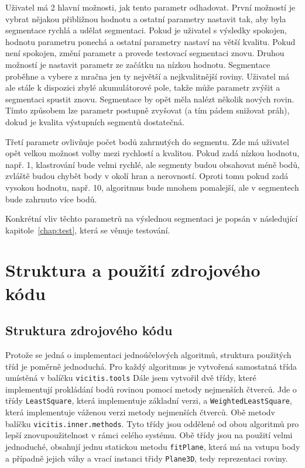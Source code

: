 \documentclass[11pt,twoside,a4paper]{book}
\begin{document}
Uživatel má 2 hlavní možnosti, jak tento parametr odhadovat. První možností je vybrat nějakou přibližnou hodnotu a ostatní parametry nastavit tak, aby byla segmentace rychlá a udělat  segmentaci. Pokud je uživatel s výsledky spokojen, hodnotu parametru ponechá a ostatní parametry nastaví na větší kvalitu. Pokud není spokojen, změní parametr a provede testovací segmentaci znovu. Druhou možností je nastavit parametr ze začátku na nízkou hodnotu. Segmentace proběhne a vybere z mračna jen ty největší a nejkvalitnější roviny. Uživatel má ale stále k dispozici zbylé akumulátorové pole, takže může parametr zvýšit a segmentaci spustit znovu. Segmentace by opět měla nalézt několik nových rovin. Tímto způsobem lze parametr postupně zvyšovat (a tím pádem snižovat práh), dokud je kvalita výstupních segmentů dostatečná.

Třetí parametr ovlivňuje počet bodů zahrnutých do segmentu. Zde má uživatel opět velkou možnost volby mezi rychlostí a kvalitou. Pokud zadá nízkou hodnotu, např. 1, klastrování bude velmi rychlé, ale segmenty budou obsahovat méně bodů, zvláště budou chybět body v okolí hran a nerovností. Oproti tomu pokud zadá vysokou hodnotu, např. 10, algoritmus bude mnohem pomalejší, ale v segmentech bude zahrnuto více bodů.

Konkrétní vliv těchto parametrů na výslednou segmentaci je popsán v následující kapitole~\ref{chap:test}, která se věnuje testování.

\section{Struktura a použití zdrojového kódu}


\subsection{Struktura zdrojového kódu}

Protože se jedná o implementaci jednoúčelových algoritmů, struktura použitých tříd je poměrně jednoduchá. Pro každý algoritmus je vytvořená samostatná třída umístěná v balíčku \verb|vicitis.tools| Dále jsem vytvořil dvě třídy, které implementují prokládání bodů rovinou pomocí metody nejmenších čtverců. Jde o třídy \verb|LeastSquare|, která implementuje základní verzi, a \verb|WeightedLeastSquare|, která implementuje váženou verzi metody nejmenších čtverců. Obě metodv balíčku \verb|vicitis.inner.methods|. Tyto třídy jsou oddělené od obou algoritmů pro lepší znovupoužitelnost v rámci celého systému. Obě třídy jsou na použití velmi jednoduché, obsahují jednu statickou metodu \verb|fitPlane|, která má na vstupu body a případně jejich váhy a vrací instanci třidy \verb|Plane3D|, tedy reprezentaci roviny.
\end{document}
